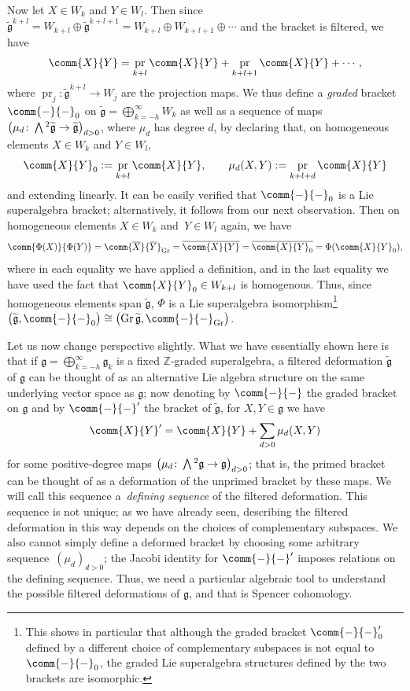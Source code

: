 \documentclass[10pt,a4paper]{amsart}
\numberwithin{equation}{section}
\newcommand{\fg}{\mathfrak{g}}
\newcommand{\ZZ}{\mathbb{Z}}
\newcommand{\fgtilde}{\widetilde{\mathfrak{g}}}
\newcommand{\Wedge}{\mathchoice{{\textstyle\bigwedge}}{\bigwedge}{\bigwedge}{\bigwedge}}	%
\newcommand{\1}{\mathbbm{1}}
\DeclareMathOperator{\Gr}{Gr}
\DeclareMathOperator{\pr}{pr}
\begin{document}
Now let $X\in W_k$ and $Y\in W_l$. Then since $\fgtilde^{k+l} = W_{k+l}\oplus\fgtilde^{k+l+1} = W_{k+l}\oplus W_{k+l+1}\oplus\cdots$ and the bracket is filtered, we have
\[
	\comm{X}{Y} = \pr_{k+l}\comm{X}{Y} + \pr_{k+l+1}\comm{X}{Y} + \cdots,
\]
where $\pr_j\colon\fgtilde^{k+l}\to W_j$ are the projection maps. We thus define a \emph{graded} bracket $\comm{-}{-}_0$ on $\fgtilde=\bigoplus_{k=-h}^\infty W_k$ as well as a sequence of maps $\bigl(\mu_d\colon\Wedge^2\fgtilde\to\fgtilde\bigr)_{d> 0}$, where $\mu_d$ has degree $d$, by declaring that, on homogeneous elements $X\in W_k$ and $Y\in W_l$,
\[
	\comm{X}{Y}_0 := \pr_{k+l}\comm{X}{Y},	\qquad \mu_d(X,Y) := \pr_{k+l+d}\comm{X}{Y}
\]
and extending linearly. It can be easily verified that $\comm{-}{-}_0$ is a Lie superalgebra bracket; alternatively, it follows from our next observation. Then on homogeneous elements $X\in W_k$ and~${Y\in W_l}$ again, we have
\[
	\comm{\Phi(X)}{\Phi(Y)} = \comm{\overline{X}}{\overline{Y}}_{\mathrm{Gr}} = \overline{\comm{X}{Y}} = \overline{\comm{X}{Y}_0} = \Phi(\comm{X}{Y}_0),
\]
where in each equality we have applied a definition, and in the last equality we have used the fact that $\comm{X}{Y}_0\in W_{k+l}$ is homogenous. Thus, since homogeneous elements span $\fgtilde$, $\Phi$ is a Lie superalgebra isomorphism\footnote{This shows in particular that although the graded bracket $\comm{-}{-}'_0$ defined by a different choice of complementary subspaces is not equal to $\comm{-}{-}_0$, the graded Lie superalgebra structures defined by the two brackets are isomorphic.}
$\bigl(\fgtilde,\comm{-}{-}_0\bigr)\cong \bigl(\Gr\fgtilde,\comm{-}{-}_{\mathrm{Gr}}\bigr)$.

Let us now change perspective slightly. What we have essentially shown here is that if $\fg=\bigoplus_{k=-h}^\infty\fg_k$ is a fixed $\ZZ$-graded superalgebra, a filtered deformation $\fgtilde$ of $\fg$ can be thought of as an alternative Lie algebra structure on the same underlying vector space as $\fg$; now denoting by $\comm{-}{-}$ the graded bracket on $\fg$ and by $\comm{-}{-}'$ the bracket of $\fgtilde$, for $X,Y\in\fg$ we have
\begin{equation}\label{eq:defining-sequence}
	\comm{X}{Y}' = \comm{X}{Y} + \sum_{d>0}\mu_d(X,Y)
\end{equation}
for some positive-degree maps $\bigl(\mu_d\colon\Wedge^2\fg\to\fg\bigr)_{d> 0}$; that is, the primed bracket can be thought of as a deformation of the unprimed bracket by these maps. We will call this sequence a~\emph{defining sequence} of the filtered deformation. This sequence is not unique; as we have already seen, describing the filtered deformation in this way depends on the choices of complementary subspaces. We also cannot simply define a deformed bracket by choosing some arbitrary sequence~$(\mu_d)_{d>0}$; the Jacobi identity for $\comm{-}{-}'$ imposes relations on the defining sequence. Thus, we need a particular algebraic tool to understand the possible filtered deformations of $\fg$, and that is Spencer cohomology.
\end{document}
